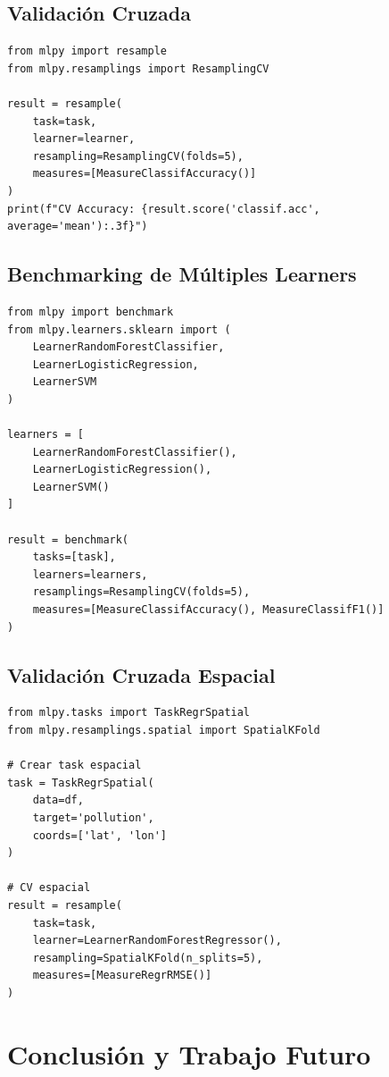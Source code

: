 \documentclass[twoside,11pt]{article}
\begin{document}
\subsection{Validación Cruzada}

\begin{lstlisting}
from mlpy import resample
from mlpy.resamplings import ResamplingCV

result = resample(
    task=task,
    learner=learner,
    resampling=ResamplingCV(folds=5),
    measures=[MeasureClassifAccuracy()]
)
print(f"CV Accuracy: {result.score('classif.acc', average='mean'):.3f}")
\end{lstlisting}

\subsection{Benchmarking de Múltiples Learners}

\begin{lstlisting}
from mlpy import benchmark
from mlpy.learners.sklearn import (
    LearnerRandomForestClassifier,
    LearnerLogisticRegression,
    LearnerSVM
)

learners = [
    LearnerRandomForestClassifier(),
    LearnerLogisticRegression(),
    LearnerSVM()
]

result = benchmark(
    tasks=[task],
    learners=learners,
    resamplings=ResamplingCV(folds=5),
    measures=[MeasureClassifAccuracy(), MeasureClassifF1()]
)
\end{lstlisting}

\subsection{Validación Cruzada Espacial}

\begin{lstlisting}
from mlpy.tasks import TaskRegrSpatial
from mlpy.resamplings.spatial import SpatialKFold

# Crear task espacial
task = TaskRegrSpatial(
    data=df,
    target='pollution',
    coords=['lat', 'lon']
)

# CV espacial
result = resample(
    task=task,
    learner=LearnerRandomForestRegressor(),
    resampling=SpatialKFold(n_splits=5),
    measures=[MeasureRegrRMSE()]
)
\end{lstlisting}

\section{Conclusión y Trabajo Futuro}
\label{sec:conclusion}
\end{document}
